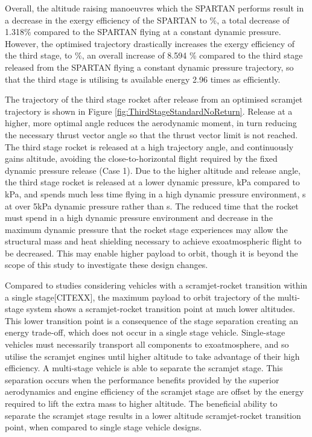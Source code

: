 Overall, the altitude raising manoeuvres which the SPARTAN performs result in a decrease in the exergy efficiency of the SPARTAN to \secondExergyEffStandardNoReturn \%, a total decrease of 1.318\% compared to the SPARTAN flying at a constant dynamic pressure. However, the optimised trajectory drastically increases the exergy efficiency of the third stage, to \thirddExergyEffStandardNoReturn \%, an overall increase of 8.594 \% compared to the third stage released from the SPARTAN flying a constant dynamic pressure trajectory, so that the third stage is utilising ts available energy 2.96 times as efficiently.  


The trajectory of the third stage rocket after release from an optimised scramjet trajectory is shown in Figure \ref{fig:ThirdStageStandardNoReturn}. Release at a higher, more optimal angle reduces the aerodynamic moment, in turn reducing the necessary thrust vector angle so that the thrust vector limit is not reached. The third stage rocket is released at a high trajectory angle, and continuously gains altitude, avoiding the close-to-horizontal flight required by the fixed dynamic pressure release (Case 1).
Due to the higher altitude and release angle, the third stage rocket is released at a lower dynamic pressure, \secondthirdSeparationqCdStandardNoReturn kPa compared to \secondthirdSeparationqConstq kPa, and spends much less time flying in a high dynamic pressure environment, \thirdqOverFiveStandard s at over 5kPa dynamic pressure rather than \thirdqOverFiveConstq s. 
The reduced time that the rocket must spend in a high dynamic pressure environment and decrease in the maximum dynamic pressure that the rocket stage experiences may allow the structural mass and heat shielding necessary to achieve exoatmospheric flight to be decreased. This may enable higher payload to orbit, though it is beyond the scope of this study to investigate these design changes. 


Compared to studies considering vehicles with a scramjet-rocket transition within a single stage\cite{Lu1993,Trefny1999}[CITEXX], the maximum payload to orbit trajectory of the multi-stage system shows a scramjet-rocket transition point at much lower altitudes.
This lower transition point is a consequence of the stage separation creating an energy trade-off, which does not occur in a single stage vehicle. Single-stage vehicles must necessarily transport all components to exoatmosphere, and so utilise the scramjet engines until higher altitude to take advantage of their high efficiency. A multi-stage vehicle is able to separate the scramjet stage. 
This separation occurs when the performance benefits provided by the superior aerodynamics and engine efficiency of the scramjet stage are offset by the energy required to lift the extra mass to higher altitude. The beneficial ability
to separate the scramjet stage results in a lower altitude scramjet-rocket transition point, when compared to single
stage vehicle designs.



